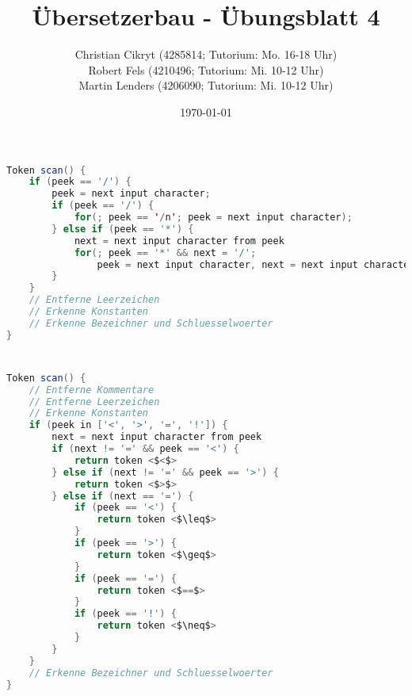 \documentclass[a4paper,10pt]{scrartcl}
\title{Übersetzerbau - Übungsblatt 4}
\author{Christian Cikryt (4285814; Tutorium: Mo. 16-18 Uhr)\\
  Robert Fels (4210496; Tutorium: Mi. 10-12 Uhr)\\
  Martin Lenders (4206090; Tutorium: Mi. 10-12 Uhr)
  }
\date{\today}
\begin{document}
\maketitle

\section{}
\begin{lstlisting}[language=Java]
Token scan() {
    if (peek == '/') {
        peek = next input character;
        if (peek == '/') {
            for(; peek == '/n'; peek = next input character);
        } else if (peek == '*') {
            next = next input character from peek
            for(; peek == '*' && next = '/'; 
                peek = next input character, next = next input character from peek);
        }
    }
    // Entferne Leerzeichen
    // Erkenne Konstanten
    // Erkenne Bezeichner und Schluesselwoerter
}
\end{lstlisting}


\section{}
\begin{lstlisting}[language=Java,mathescape=True]
Token scan() {
    // Entferne Kommentare
    // Entferne Leerzeichen
    // Erkenne Konstanten
    if (peek in ['<', '>', '=', '!']) {
        next = next input character from peek
        if (next != '=' && peek == '<') {
            return token <$<$>
        } else if (next != '=' && peek == '>') {
            return token <$>$>
        } else if (next == '=') {
            if (peek == '<') {
                return token <$\leq$>
            }
            if (peek == '>') {
                return token <$\geq$>
            }
            if (peek == '=') {
                return token <$==$>
            }
            if (peek == '!') {
                return token <$\neq$>
            }
        }
    }
    // Erkenne Bezeichner und Schluesselwoerter
}
\end{lstlisting}
\end{document}

